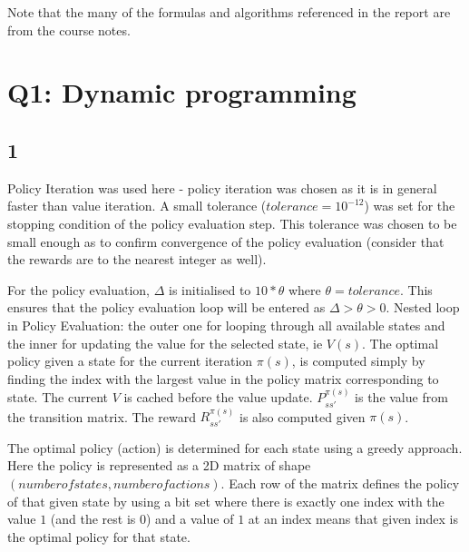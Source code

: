 
Note that the many of the formulas and algorithms referenced in the 
report are from the course notes.

\section*{Q1: Dynamic programming}
\subsection*{1}
Policy Iteration was used here - policy iteration was chosen as 
it is in general faster than value iteration.
A small tolerance ($tolerance = 10^{-12}$) was set for the 
stopping condition of the policy evaluation step. This 
tolerance was chosen to be small enough as to confirm convergence 
of the policy evaluation (consider that the rewards are to the 
nearest integer as well).


For the policy evaluation, $\Delta$ is initialised to $10 * \theta$ 
where $\theta = tolerance$. This ensures that the policy evaluation
loop will be entered as $\Delta > \theta > 0$. 
Nested loop in Policy Evaluation: the outer one for looping 
through all available states and the inner for updating the value 
for the selected state, ie $V(s)$.
The optimal policy given a state for the current iteration $\pi(s)$,
is computed simply by finding the index with the largest value
in the policy matrix corresponding to state.
The current $V$ is cached before the value update.  
$P^{\pi(s)}_{s s'}$ is the value from the transition matrix. 
The reward $R^{\pi(s)}_{s s'}$ is also computed given $\pi(s)$.

The optimal policy (action) is determined for each state using a 
greedy approach. 
Here the policy is represented as a 2D matrix of shape 
$(number of states, number of actions)$. Each row of the matrix 
defines the policy of that given state by using a bit set where 
there is exactly one index with the value $1$ (and the rest is $0$) 
and a value of $1$ at an index means that given index is the optimal
policy for that state. 

